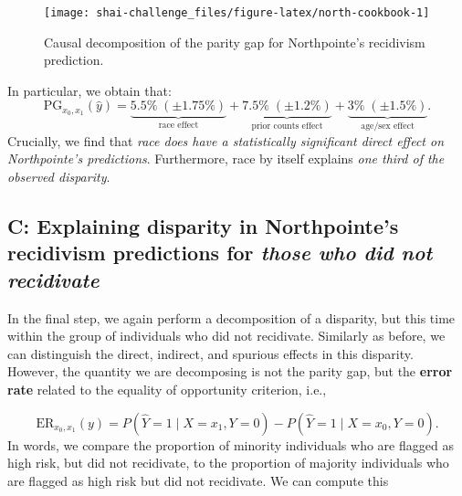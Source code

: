 \documentclass{article}
\begin{document}
\begin{figure}

{\centering \texttt{[image: shai-challenge\_files/figure-latex/north-cookbook-1]} 

}

\caption{Causal decomposition of the parity gap for Northpointe's recidivism prediction.}\label{fig:north-cookbook}
\end{figure}

In particular, we obtain that: \begin{equation}
  \text{PG}_{x_0, x_1}(\hat{y}) = \underbrace{5.5\% \;(\pm 1.75\%)}_{\text{race effect}} +  \underbrace{7.5\% \;(\pm 1.2\%)}_{\text{prior counts effect}} +  \underbrace{3\%\;(\pm 1.5\%)}_{\text{age/sex effect}}.
\end{equation} Crucially, we find that \emph{race does have a
statistically significant direct effect on Northpointe's predictions}.
Furthermore, race by itself explains \emph{one third of the observed
disparity}.

\hypertarget{c-explaining-disparity-in-northpointes-recidivism-predictions-for-those-who-did-not-recidivate}{%
\subsection{\texorpdfstring{C: Explaining disparity in Northpointe's
recidivism predictions for \emph{those who did not
recidivate}}{C: Explaining disparity in Northpointe's recidivism predictions for those who did not recidivate}}\label{c-explaining-disparity-in-northpointes-recidivism-predictions-for-those-who-did-not-recidivate}}

In the final step, we again perform a decomposition of a disparity, but
this time within the group of individuals who did not recidivate.
Similarly as before, we can distinguish the direct, indirect, and
spurious effects in this disparity. However, the quantity we are
decomposing is not the parity gap, but the \textbf{error rate} related
to the equality of opportunity criterion, i.e.,

\begin{equation}
\text{ER}_{x_0, x_1}(y) = P(\hat{Y} = 1 \mid X = x_1, Y = 0) - P(\hat{Y} = 1 \mid X = x_0, Y = 0).
\end{equation} In words, we compare the proportion of minority
individuals who are flagged as high risk, but did not recidivate, to the
proportion of majority individuals who are flagged as high risk but did
not recidivate. We can compute this
\end{document}
